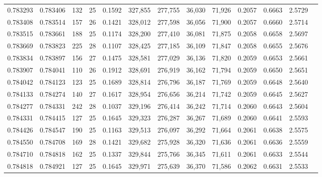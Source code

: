 \begin{tabular}{rrrrrrrrrrrrr}
0.783293 & 0.783406 &   132 &  25 &                                     0.1592 & 327,855 & 277,755 &  36,030 &  71,926 & 0.2057 & 0.6663 & 2.5729 \\
0.783408 & 0.783514 &   157 &  26 &                                     0.1421 & 328,012 & 277,598 &  36,056 &  71,900 & 0.2057 & 0.6660 & 2.5714 \\
0.783515 & 0.783661 &   188 &  25 &                                     0.1174 & 328,200 & 277,410 &  36,081 &  71,875 & 0.2058 & 0.6658 & 2.5697 \\
0.783669 & 0.783823 &   225 &  28 &                                     0.1107 & 328,425 & 277,185 &  36,109 &  71,847 & 0.2058 & 0.6655 & 2.5676 \\
0.783834 & 0.783897 &   156 &  27 &                                     0.1475 & 328,581 & 277,029 &  36,136 &  71,820 & 0.2059 & 0.6653 & 2.5661 \\
0.783907 & 0.784041 &   110 &  26 &                                     0.1912 & 328,691 & 276,919 &  36,162 &  71,794 & 0.2059 & 0.6650 & 2.5651 \\
0.784042 & 0.784123 &   123 &  25 &                                     0.1689 & 328,814 & 276,796 &  36,187 &  71,769 & 0.2059 & 0.6648 & 2.5640 \\
0.784133 & 0.784274 &   140 &  27 &                                     0.1617 & 328,954 & 276,656 &  36,214 &  71,742 & 0.2059 & 0.6645 & 2.5627 \\
0.784277 & 0.784331 &   242 &  28 &                                     0.1037 & 329,196 & 276,414 &  36,242 &  71,714 & 0.2060 & 0.6643 & 2.5604 \\
0.784331 & 0.784415 &   127 &  25 &                                     0.1645 & 329,323 & 276,287 &  36,267 &  71,689 & 0.2060 & 0.6641 & 2.5593 \\
0.784426 & 0.784547 &   190 &  25 &                                     0.1163 & 329,513 & 276,097 &  36,292 &  71,664 & 0.2061 & 0.6638 & 2.5575 \\
0.784550 & 0.784708 &   169 &  28 &                                     0.1421 & 329,682 & 275,928 &  36,320 &  71,636 & 0.2061 & 0.6636 & 2.5559 \\
0.784710 & 0.784818 &   162 &  25 &                                     0.1337 & 329,844 & 275,766 &  36,345 &  71,611 & 0.2061 & 0.6633 & 2.5544 \\
0.784818 & 0.784921 &   127 &  25 &                                     0.1645 & 329,971 & 275,639 &  36,370 &  71,586 & 0.2062 & 0.6631 & 2.5533 \\

\end{tabular}
